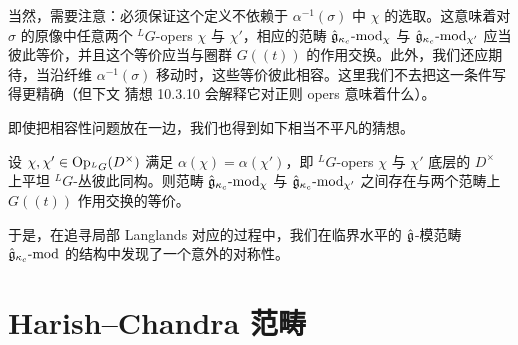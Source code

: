 当然，需要注意：必须保证这个定义不依赖于 $\alpha^{-1}(\sigma)$ 中 $\chi$ 的选取。这意味着对 $\sigma$ 的原像中任意两个 ${}^L G$-opers $\chi$ 与 $\chi'$，相应的范畴 $\hat{\mathfrak{g}}_{\kappa_c}\text{-}\mathrm{mod}_\chi$ 与 $\hat{\mathfrak{g}}_{\kappa_c}\text{-}\mathrm{mod}_{\chi'}$ 应当彼此等价，并且这个等价应当与圈群 $G((t))$ 的作用交换。此外，我们还应期待，当沿纤维 $\alpha^{-1}(\sigma)$ 移动时，这些等价彼此相容。这里我们不去把这一条件写得更精确（但下文 猜想 10.3.10 会解释它对正则 opers 意味着什么）。

即使把相容性问题放在一边，我们也得到如下相当不平凡的猜想。

\begin{conjecture}\label{conj:u14-fiber}
    设 $\chi,\chi'\in\operatorname{Op}_{{}^L G}(D^\times)$ 满足 $\alpha(\chi)=\alpha(\chi')$，即 ${}^L G$-opers $\chi$ 与 $\chi'$ 底层的 $D^\times$ 上平坦 ${}^L G$-丛彼此同构。则范畴 $\hat{\mathfrak{g}}_{\kappa_c}\text{-}\mathrm{mod}_\chi$ 与 $\hat{\mathfrak{g}}_{\kappa_c}\text{-}\mathrm{mod}_{\chi'}$ 之间存在与两个范畴上 $G((t))$ 作用交换的等价。
\end{conjecture}

于是，在追寻局部 Langlands 对应的过程中，我们在临界水平的 $\hat{\mathfrak{g}}$-模范畴 $\hat{\mathfrak{g}}_{\kappa_c}\text{-}\mathrm{mod}$ 的结构中发现了一个意外的对称性。

\section{Harish--Chandra 范畴}

